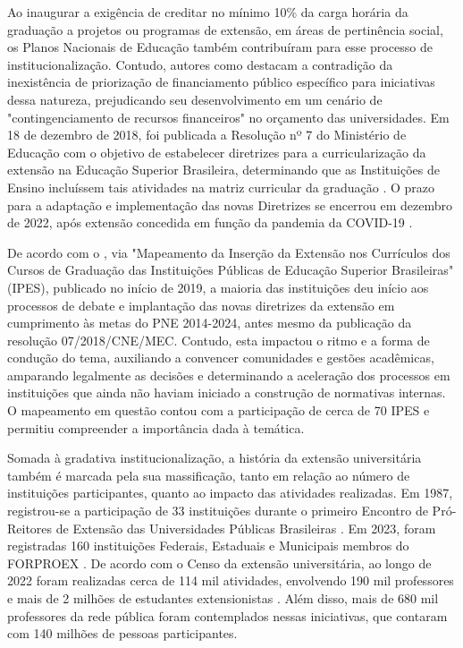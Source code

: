 \documentclass[portuguese]{textolivre}
\begin{document}
Ao inaugurar a exigência de creditar no mínimo 10\% da carga horária da
graduação a projetos ou programas de extensão, em áreas de pertinência
social, os Planos Nacionais de Educação \cite{Brasil2001} também
contribuíram para esse processo de institucionalização. Contudo, autores
como \textcite[p.~7]{Gomez2019} destacam a contradição da
inexistência de priorização de financiamento público específico para
iniciativas dessa natureza, prejudicando seu desenvolvimento em um
cenário de "contingenciamento de recursos financeiros" no orçamento das
universidades. Em 18 de dezembro de 2018, foi publicada a Resolução nº 7
do Ministério de Educação com o objetivo de estabelecer diretrizes para
a curricularização da extensão na Educação Superior Brasileira,
determinando que as Instituições de Ensino incluíssem tais atividades na
matriz curricular da graduação \cite{Brasil2018}. O prazo para a
adaptação e implementação das novas Diretrizes se encerrou em dezembro
de 2022, após extensão concedida em função da pandemia da COVID-19
\cite{Brasil2020}.

De acordo com o \textcite{FORPROEX2019}, via "Mapeamento da Inserção da Extensão
nos Currículos dos Cursos de Graduação das Instituições Públicas de
Educação Superior Brasileiras" (IPES), publicado no início de 2019, a
maioria das instituições deu início aos processos de debate e
implantação das novas diretrizes da extensão em cumprimento às metas do
PNE 2014-2024, antes mesmo da publicação da resolução 07/2018/CNE/MEC.
Contudo, esta impactou o ritmo e a forma de condução do tema, auxiliando
a convencer comunidades e gestões acadêmicas, amparando legalmente as
decisões e determinando a aceleração dos processos em instituições que
ainda não haviam iniciado a construção de normativas internas. O
mapeamento em questão contou com a participação de cerca de 70 IPES e
permitiu compreender a importância dada à temática.

Somada à gradativa institucionalização, a história da extensão
universitária também é marcada pela sua massificação, tanto em relação
ao número de instituições participantes, quanto ao impacto das
atividades realizadas. Em 1987, registrou-se a participação de 33
instituições durante o primeiro Encontro de Pró-Reitores de Extensão das
Universidades Públicas Brasileiras \cite{FORPROEX1987}. Em 2023, foram
registradas 160 instituições Federais, Estaduais e Municipais membros do
FORPROEX \cite{RENEX2016}. De acordo com o Censo da extensão
universitária, ao longo de 2022 foram realizadas cerca de 114 mil
atividades, envolvendo 190 mil professores e mais de 2 milhões de
estudantes extensionistas \cite{RENEX2023}. Além disso, mais de 680 mil
professores da rede pública foram contemplados nessas iniciativas, que
contaram com 140 milhões de pessoas participantes.
\end{document}
